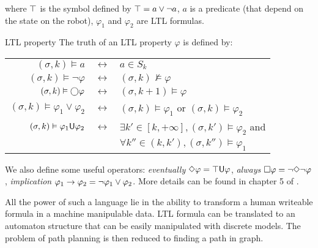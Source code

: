 where $\top$ is the symbol defined by $\top = a\lor \lnot a$, $a$ is a predicate (that depend on the state on the robot), $\varphi_1$ and $\varphi_2$ are LTL formulas.

\begin{nameddef}{LTL property}
The truth of an LTL property $\varphi$ is defined by:
\begin{tabular}[b]{rcl}
$(\sigma,k) \vDash a$ & $\leftrightarrow$ & $a \in S_k$\\
$(\sigma,k) \vDash \lnot \varphi$ & $\leftrightarrow$ &  $(\sigma,k) \nvDash  \varphi$ \\
$(\sigma,k) \vDash \bigcirc \varphi$ & $\leftrightarrow$ &  $(\sigma,k+1) \vDash  \varphi$ \\
$(\sigma,k) \vDash \varphi_1 \lor \varphi_2$ & $\leftrightarrow$ &  $(\sigma,k) \vDash  \varphi_1$ or $(\sigma,k) \vDash  \varphi_2$ \\
$(\sigma,k) \vDash \varphi_1 \mathsf{U} \varphi_2$ & $\leftrightarrow$ &  $\exists k' \in \left [k, +\infty \right ] , (\sigma,k') \vDash \varphi_2$ and \\
& & $\forall k'' \in (k,k'), (\sigma,k'') \vDash \varphi_1$ \\
\end{tabular}
\end{nameddef}

We also define some useful operators: \textit{eventually} $\Diamond \varphi = \top \mathsf{U} \varphi$, \textit{always} $\square \varphi = \lnot \Diamond \lnot \varphi$, \textit{implication} $\varphi_1 \rightarrow \varphi_2 = \lnot \varphi_1 \lor \varphi_2$.
More details can be found in chapter 5 of \cite{principlemodelchecking}.

All the power of such a language lie in the ability to transform a human writeable formula in a machine manipulable data. LTL formula can be translated to an automaton structure that can be easily manipulated with discrete models. The problem of path planning is then reduced to finding a path in graph.


